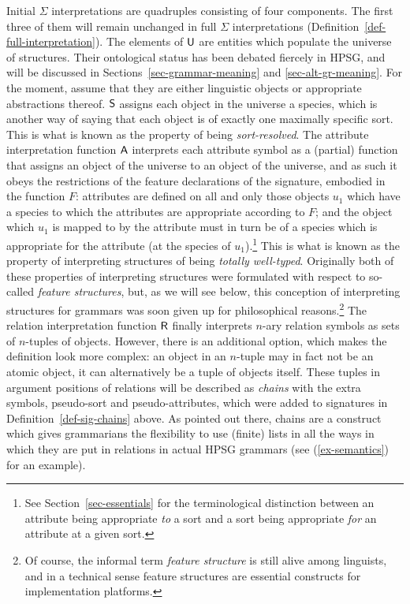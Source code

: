 \documentclass[output=paper
                ,modfonts
                ,nonflat
	        ,collection
	        ,collectionchapter
	        ,collectiontoclongg
 	        ,biblatex
                ,babelshorthands
                ,newtxmath
                ,draftmode
                ,colorlinks, citecolor=brown
]{./langsci/langscibook}
\begin{document}
{{Initial $\Sigma$ interpretations are quadruples consisting of four
components. The first three of them will remain unchanged in full
$\Sigma$ interpretations (Definition~\ref{def-full-interpretation}). The elements of $\mathsf{U}$
are entities which populate the universe of structures. Their ontological
status has been debated fiercely in HPSG, and will be discussed in
Sections~\ref{sec-grammar-meaning} and \ref{sec-alt-gr-meaning}. For the
moment, assume that they are either linguistic objects or appropriate
abstractions thereof. $\mathsf{S}$ assigns each object in the universe
a species, which is another way of saying that each object is of exactly
one maximally specific sort. This is what is known as the property of being
\emph{sort-resolved}. The attribute interpretation function $\mathsf{A}$
interprets each attribute symbol as a (partial) function that assigns an
object of the universe to an object of the universe, and as such it
obeys the restrictions of the feature declarations of the signature,
embodied in the function $F$: attributes are defined on all and only
those objects $u_1$ which have a species to which the attributes are appropriate
according to $F$; and the object which $u_1$ is mapped to by the attribute
must in turn be of a species which is appropriate for the attribute
(at the species of $u_1$).\footnote{See Section~\ref{sec-essentials} for the terminological
  distinction between an attribute being appropriate \emph{to} a sort and a sort
  being appropriate \emph{for} an attribute at a given sort.}
This is what is known as the property of
interpreting structures of being \emph{totally well-typed}. Originally both
of these properties of interpreting structures were formulated with
respect to so-called \emph{feature structures}, but, as we will see below,
this conception of interpreting structures for grammars
was soon given up for philosophical reasons.\footnote{Of course, the
  informal term \emph{feature structure} is still alive among
  linguists, and in a technical sense feature structures are essential constructs
  for implementation platforms.} The relation interpretation function
$\mathsf{R}$ finally interprets $n$-ary
relation symbols as sets of $n$-tuples of objects. However, there is
an additional option, which makes the definition look more complex: an
object in an $n$-tuple may in fact not be an atomic object, it can
alternatively be a tuple of objects itself. These tuples in
argument positions of relations will be described as \emph{chains}
with the extra symbols, pseudo-sort and pseudo-attributes, which were
added to signatures in
Definition~\ref{def-sig-chains} above.  As pointed out there, chains
are a construct which gives grammarians the flexibility to
use (finite) lists in all the ways in which they are put in relations
in actual HPSG grammars (see (\ref{ex-semantics}) for an example). %

}}
\end{document}
